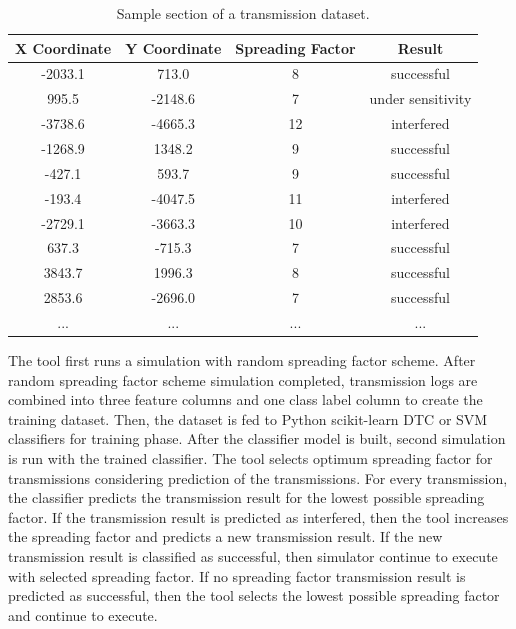 \begin{table}
\centering
\caption{Sample section of a transmission dataset.}
\label{table:dataset}
\begin{tabular}{|c|c|c|c|}
\hline
\textbf{X Coordinate} & \textbf{Y Coordinate} & \textbf{Spreading Factor} & \textbf{Result} \\ \hline
      -2033.1  &  713.0  &   8   &   successful \\ \hline
       995.5   & -2148.6 &   7   &   under sensitivity \\ \hline
      -3738.6  & -4665.3 &   12  &   interfered \\ \hline
      -1268.9  &  1348.2 &   9   &   successful \\ \hline
      -427.1   &  593.7  &   9   &   successful \\ \hline
      -193.4   & -4047.5 &   11  &   interfered \\ \hline
      -2729.1  & -3663.3 &   10  &   interfered \\ \hline
       637.3   & -715.3 &   7   &   successful \\ \hline
       3843.7  &  1996.3 &   8   &   successful \\ \hline
       2853.6  & -2696.0 &   7   &   successful \\ \hline
      ...      & ...     &   ... &   ... \\ \hline
\end{tabular}
\end{table}

The tool first runs a simulation with random spreading factor scheme. After random spreading factor scheme simulation completed, transmission logs are combined into three feature columns and one class label column to create the training dataset. Then, the dataset is fed to Python scikit-learn DTC or SVM classifiers for training phase. After the classifier model is built, second simulation is run with the trained classifier. The tool selects optimum spreading factor for transmissions considering prediction of the transmissions. For every transmission, the classifier predicts the transmission result for the lowest possible spreading factor. If the transmission result is predicted as interfered, then the tool increases the spreading factor and predicts a new transmission result. If the new transmission result is classified as successful, then simulator continue to execute with selected spreading factor. If no spreading factor transmission result is predicted as successful, then the tool selects the lowest possible spreading factor and continue to execute.
